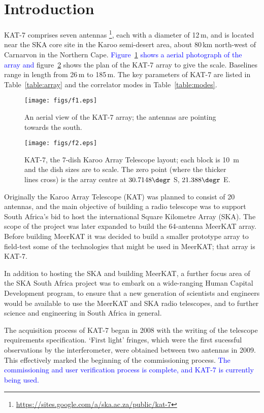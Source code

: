\section{Introduction}
\noindent

KAT-7 comprises seven antennas
\footnote{\url{https://sites.google.com/a/ska.ac.za/public/kat-7}},
each with a diameter of 12\,m, and is located near the SKA core site
in the Karoo semi-desert area, about 80\,km north-west of Carnarvon in
the Northern Cape.  \textcolor{blue}{Figure~\ref{fig:aerial} shows a
  aerial photograph of the array and} figure~\ref{fig:layout} shows
the plan of the KAT-7 array to give the scale. Baselines range in
length from 26\,m to 185\,m. The key parameters of KAT-7 are listed in
Table~\ref{table:array} and the correlator modes in
Table~\ref{table:modes}.

\begin{figure}
\texttt{[image: figs/f1.eps]}
\caption{An aerial view of the KAT-7 array; the antennas are pointing 
towards the south.}
\label{fig:aerial}
\end{figure}


\begin{figure} 
  \texttt{[image: figs/f2.eps]}
  \caption{KAT-7, the 7-dish Karoo Array Telescope layout; each block
    is 10~m and the dish sizes are to scale. The zero point (where the
    thicker lines cross) is the array centre at $30.7148\degr$ S,
    $21.388\degr$ E.}
\label{fig:layout}
\end{figure}

Originally the Karoo Array Telescope (KAT) was planned to consist of
20 antennas, and the main objective of building a radio telescope was
to support South Africa's bid to host the international Square
Kilometre Array (SKA). The scope of the project was later expanded to
build the 64-antenna MeerKAT array.  Before building MeerKAT it was
decided to build a smaller prototype array to field-test some of the
technologies that might be used in MeerKAT; that array is KAT-7.

In addition to hosting the SKA and building MeerKAT, a further focus
area of the SKA South Africa project was to embark on a wide-ranging
Human Capital Development program, to ensure that a new generation of
scientists and engineers would be available to use the MeerKAT and SKA
radio telescopes, and to further science and engineering in South
Africa in general.


The acquisition process of KAT-7 began in 2008 with the writing of the
telescope requirements specification. `First light' fringes, which
were the first sucessful observations by the interferometer, were obtained
between two antennas in 2009. This effectively marked the beginning of
the commissioning process. \textcolor{blue}{The commissioning and user
  verification process is complete, and KAT-7 is currently being
  used.}

